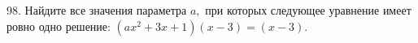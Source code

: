 98. Найдите все значения параметра $a,$ при которых следующее уравнение имеет ровно одно решение: $(ax^2+3x+1)(x-3)=(x-3).$\\
